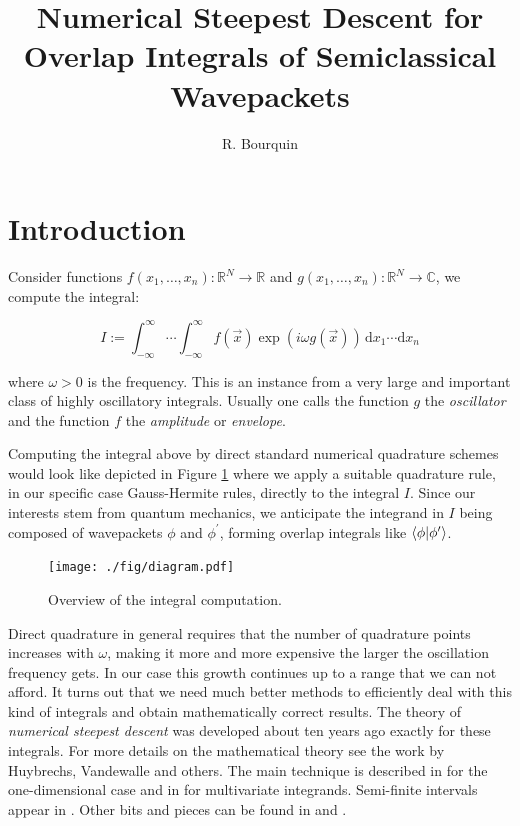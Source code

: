 \documentclass[a4paper,10pt]{article}
\title{Numerical Steepest Descent for Overlap Integrals of Semiclassical Wavepackets}
\author{R. Bourquin}
\begin{document}
\maketitle

\section{Introduction}


Consider functions $f(x_1, \ldots, x_n):\mathbb{R}^N\rightarrow\mathbb{R}$ and
$g(x_1, \ldots, x_n):\mathbb{R}^N\rightarrow\mathbb{C}$, we compute the integral:

\begin{equation} \label{eq:hoi}
 I := \int_{-\infty}^{\infty} \cdots \int_{-\infty}^{\infty}
      f(\vec{x}) \exp(i \omega g(\vec{x}))
      \, \mathrm{d}x_1 \cdots \mathrm{d}x_n
\end{equation}

where $\omega > 0$ is the frequency.
This is an instance from a very large and important class of highly oscillatory integrals.
Usually one calls the function $g$ the \emph{oscillator} and the function $f$ the
\emph{amplitude} or \emph{envelope}.

Computing the integral above by direct standard numerical quadrature schemes
would look like depicted in Figure \ref{fig:transformation_chain_1} where we apply a
suitable quadrature rule, in our specific case Gauss-Hermite rules, directly to the
integral $I$. Since our interests stem from quantum mechanics, we anticipate the
integrand in $I$ being composed of wavepackets $\phi$ and
$\phi^\prime$, forming overlap integrals like $\braket{\phi|\phi^\prime}$.

\begin{figure}[h!]
  \centering
  \texttt{[image: ./fig/diagram.pdf]}
  \caption{Overview of the integral computation.}
  \label{fig:transformation_chain_1}
\end{figure}

Direct quadrature in general requires that the number of quadrature points
increases with $\omega$, making it more and more expensive the larger the
oscillation frequency gets. In our case this growth continues up to a range
that we can not afford.
It turns out that we need much better methods to efficiently deal with this
kind of integrals and obtain mathematically correct results.
The theory of \emph{numerical steepest descent} was developed about ten
years ago exactly for these integrals. For more details on the mathematical theory
see the work by Huybrechs, Vandewalle and others. The main technique
is described in \cite{HV_hoq} for the one-dimensional case and in \cite{HV_cub}
for multivariate integrands. Semi-finite intervals appear in \cite{H_nsd_sii}.
Other bits and pieces can be found in \cite{AH_cgq} and \cite{AH_cgq_it}.
\end{document}
